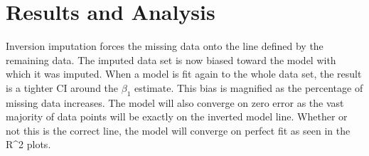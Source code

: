 \documentclass[../paper.tex]{subfiles}
\begin{document}
\section{Results and Analysis}

Inversion imputation forces the missing data onto the line defined by the remaining data. The imputed data set is now biased
toward the model with which it was imputed. When a model is fit again to the whole data set, the result is a
tighter CI around the $\beta_{1}$ estimate. This bias is magnified as the percentage of missing data increases. The model will
also converge on zero error as the vast majority of data points will be exactly on the inverted model line. Whether or
not this is the correct line, the model will converge on perfect fit as seen in the R^2 plots.
\end{document}
